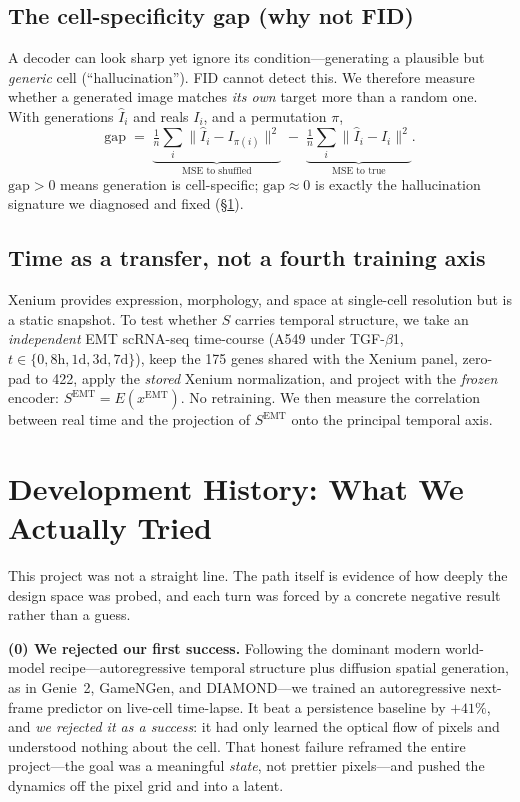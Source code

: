\documentclass[10pt,twocolumn]{article}
\begin{document}
\subsection{The cell-specificity gap (why not FID)}
A decoder can look sharp yet ignore its condition---generating a plausible but
\emph{generic} cell (``hallucination''). FID cannot detect this. We therefore
measure whether a generated image matches \emph{its own} target more than a
random one. With generations $\hat I_i$ and reals $I_i$, and a permutation
$\pi$,
\begin{equation}
\mathrm{gap} \;=\; \underbrace{\tfrac1n\textstyle\sum_i\lVert \hat I_i-I_{\pi(i)}\rVert^2}_{\text{MSE to shuffled}} \;-\; \underbrace{\tfrac1n\textstyle\sum_i\lVert \hat I_i-I_i\rVert^2}_{\text{MSE to true}} .
\end{equation}
$\mathrm{gap}>0$ means generation is cell-specific; $\mathrm{gap}\approx0$ is
exactly the hallucination signature we diagnosed and fixed (\S\ref{sec:history}).

\subsection{Time as a transfer, not a fourth training axis}
Xenium provides expression, morphology, and space at single-cell resolution but
is a static snapshot. To test whether $S$ carries temporal structure, we take an
\emph{independent} EMT scRNA-seq time-course (A549 under TGF-$\beta$1,
$t\in\{0,8\text{h},1\text{d},3\text{d},7\text{d}\}$), keep the 175 genes shared
with the Xenium panel, zero-pad to 422, apply the \emph{stored} Xenium
normalization, and project with the \emph{frozen} encoder: $S^{\text{EMT}}=E(x^{\text{EMT}})$.
No retraining. We then measure the correlation between real time and the
projection of $S^{\text{EMT}}$ onto the principal temporal axis.

\section{Development History: What We Actually Tried}
\label{sec:history}
This project was not a straight line. The path itself is evidence of how deeply
the design space was probed, and each turn was forced by a concrete negative
result rather than a guess.

\noindent\textbf{(0) We rejected our first success.} Following the dominant
modern world-model recipe---autoregressive temporal structure plus diffusion
spatial generation, as in Genie~2, GameNGen, and DIAMOND---we trained an
autoregressive next-frame predictor on live-cell time-lapse. It beat a
persistence baseline by $+41\%$, and \emph{we rejected it as a success}: it had
only learned the optical flow of pixels and understood nothing about the cell.
That honest failure reframed the entire project---the goal was a meaningful
\emph{state}, not prettier pixels---and pushed the dynamics off the pixel grid
and into a latent.
\end{document}
